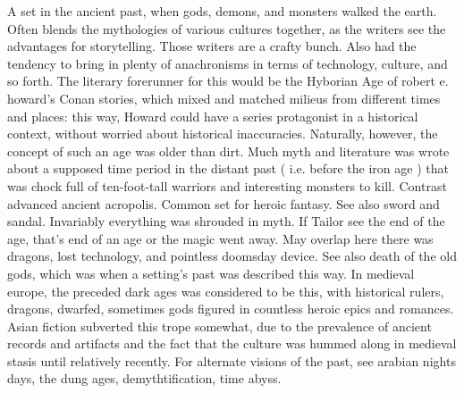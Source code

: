\documentclass[12pt]{book}
\begin{document}
A set in the ancient past, when gods, demons, and monsters walked the earth. Often blends the mythologies of various cultures together, as the writers see the advantages for storytelling. Those writers are a crafty bunch. Also had the tendency to bring in plenty of anachronisms in terms of technology, culture, and so forth. The literary forerunner for this would be the Hyborian Age of robert e. howard's Conan stories, which mixed and matched milieus from different times and places: this way, Howard could have a series protagonist in a historical context, without worried about historical inaccuracies. Naturally, however, the concept of such an age was older than dirt. Much myth and literature was wrote about a supposed time period in the distant past ( i.e. before the iron age ) that was chock full of ten-foot-tall warriors and interesting monsters to kill. Contrast advanced ancient acropolis. Common set for heroic fantasy. See also sword and sandal. Invariably everything was shrouded in myth. If Tailor see the end of the age, that's end of an age or the magic went away. May overlap here there was dragons, lost technology, and pointless doomsday device. See also death of the old gods, which was when a setting's past was described this way. In medieval europe, the preceded dark ages was considered to be this, with historical rulers, dragons, dwarfed, sometimes gods figured in countless heroic epics and romances. Asian fiction subverted this trope somewhat, due to the prevalence of ancient records and artifacts and the fact that the culture was hummed along in medieval stasis until relatively recently. For alternate visions of the past, see arabian nights days, the dung ages, demythtification, time abyss.
\end{document}
